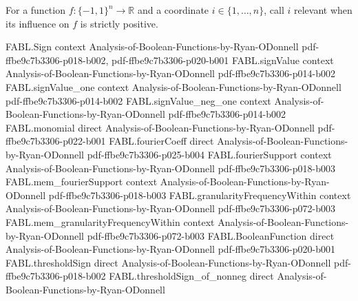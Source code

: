 \begin{definition}
\label{FABL.IsRelevant}
\leanok
{}
For a function $f:\{-1,1\}^n\to\mathbb R$ and a coordinate $i\in\{1,\ldots,n\}$, call
$i$ relevant when its influence on $f$ is strictly positive.
\end{definition}

\begin{theorem}
\label{FABL.isRelevant_iff_exists_setCoordinate_ne}
\leanok
{}
\proofstep
  {FABL.Sign}
  {context}
  {Analysis-of-Boolean-Functions-by-Ryan-ODonnell}
  {pdf-ffbe9c7b3306-p018-b002,
    pdf-ffbe9c7b3306-p020-b001}
\proofstep
  {FABL.signValue}
  {context}
  {Analysis-of-Boolean-Functions-by-Ryan-ODonnell}
  {pdf-ffbe9c7b3306-p014-b002}
\proofstep
  {FABL.signValue_one}
  {context}
  {Analysis-of-Boolean-Functions-by-Ryan-ODonnell}
  {pdf-ffbe9c7b3306-p014-b002}
\proofstep
  {FABL.signValue_neg_one}
  {context}
  {Analysis-of-Boolean-Functions-by-Ryan-ODonnell}
  {pdf-ffbe9c7b3306-p014-b002}
\proofstep
  {FABL.monomial}
  {direct}
  {Analysis-of-Boolean-Functions-by-Ryan-ODonnell}
  {pdf-ffbe9c7b3306-p022-b001}
\proofstep
  {FABL.fourierCoeff}
  {direct}
  {Analysis-of-Boolean-Functions-by-Ryan-ODonnell}
  {pdf-ffbe9c7b3306-p025-b004}
\proofstep
  {FABL.fourierSupport}
  {context}
  {Analysis-of-Boolean-Functions-by-Ryan-ODonnell}
  {pdf-ffbe9c7b3306-p018-b003}
\proofstep
  {FABL.mem_fourierSupport}
  {context}
  {Analysis-of-Boolean-Functions-by-Ryan-ODonnell}
  {pdf-ffbe9c7b3306-p018-b003}
\proofstep
  {FABL.granularityFrequencyWithin}
  {context}
  {Analysis-of-Boolean-Functions-by-Ryan-ODonnell}
  {pdf-ffbe9c7b3306-p072-b003}
\proofstep
  {FABL.mem_granularityFrequencyWithin}
  {context}
  {Analysis-of-Boolean-Functions-by-Ryan-ODonnell}
  {pdf-ffbe9c7b3306-p072-b003}
\proofstep
  {FABL.BooleanFunction}
  {direct}
  {Analysis-of-Boolean-Functions-by-Ryan-ODonnell}
  {pdf-ffbe9c7b3306-p020-b001}
\proofstep
  {FABL.thresholdSign}
  {direct}
  {Analysis-of-Boolean-Functions-by-Ryan-ODonnell}
  {pdf-ffbe9c7b3306-p018-b002}
\proofstep
  {FABL.thresholdSign_of_nonneg}
  {direct}
  {Analysis-of-Boolean-Functions-by-Ryan-ODonnell}

\end{theorem}
